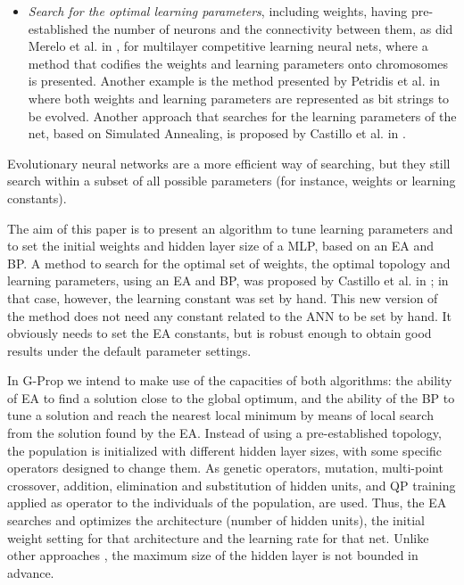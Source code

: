 \documentclass{llncs}
\begin{document}
\begin{itemize}
      \item \emph{Search for the optimal learning parameters}, including weights, having pre-established the number of neurons and the connectivity between them, as did Merelo et al. in \cite{competitiveNNGA}, for multilayer competitive learning neural nets, where a method that codifies the weights and learning parameters onto chromosomes is presented. Another example is the method presented by Petridis et al. in \cite{Petridis} where both weights and learning parameters are represented as bit strings to be evolved. Another approach that searches for the learning parameters of the net, based on Simulated Annealing, is proposed by Castillo et al. in \cite{Castillo2}.

\end{itemize}

Evolutionary neural networks are a more efficient way of searching, but they still search within a subset of all possible parameters (for instance, weights or learning constants).

The aim of this paper is to present an algorithm to tune learning parameters and to set the initial weights and hidden layer size of a MLP, based on an EA and BP. 
A method to search for the optimal set of weights, the optimal topology and learning parameters, using an EA and BP, was proposed by Castillo et al. in \cite{Castillo3}; in that case, however, the learning constant was set by hand. This new version of the method does not need any constant related to the ANN to be set by hand. It obviously needs to set the EA constants, but is robust enough to obtain good results under the default parameter settings.

In G-Prop we intend to make use of the capacities of both algorithms: the ability of EA to find a solution close to the global optimum, and the ability of the BP to tune a solution and reach the nearest local minimum by means of local search from the solution found by the EA.
Instead of using a pre-established topology, the population is initialized with different hidden layer sizes, with some specific operators designed to change them.
As genetic operators, mutation, multi-point crossover, addition, elimination and substitution of hidden units, and QP training applied as operator to the individuals of the population, are used.
Thus, the EA searches and optimizes the architecture (number of hidden units), the initial weight setting for that architecture and the learning rate for that net.
Unlike other approaches \cite{Yao98}, the maximum size of the hidden layer is not bounded in advance.
\end{document}
